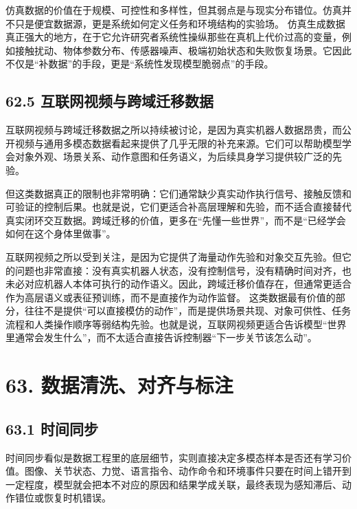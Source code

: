 仿真数据的价值在于规模、可控性和多样性，但其弱点是与现实分布错位。仿真并不只是便宜数据源，更是系统如何定义任务和环境结构的实验场。 仿真生成数据真正强大的地方，在于它允许研究者系统性操纵那些在真机上代价过高的变量，例如接触扰动、物体参数分布、传感器噪声、极端初始状态和失败恢复场景。它因此不仅是“补数据”的手段，更是“系统性发现模型脆弱点”的手段。

\section*{62.5 互联网视频与跨域迁移数据}


互联网视频与跨域迁移数据之所以持续被讨论，是因为真实机器人数据昂贵，而公开视频与通用多模态数据看起来提供了几乎无限的补充来源。它们可以帮助模型学会对象外观、场景关系、动作意图和任务语义，为后续具身学习提供较广泛的先验。

但这类数据真正的限制也非常明确：它们通常缺少真实动作执行信号、接触反馈和可验证的控制后果。也就是说，它们更适合补高层理解和先验，而不适合直接替代真实闭环交互数据。跨域迁移的价值，更多在“先懂一些世界”，而不是“已经学会如何在这个身体里做事”。

互联网视频之所以受到关注，是因为它提供了海量动作先验和对象交互先验。但它的问题也非常直接：没有真实机器人状态，没有控制信号，没有精确时间对齐，也未必对应机器人本体可执行的动作语义。因此，跨域迁移价值存在，但通常更适合作为高层语义或表征预训练，而不是直接作为动作监督。 这类数据最有价值的部分，往往不是提供“可以直接模仿的动作”，而是提供场景共现、对象可供性、任务流程和人类操作顺序等弱结构先验。也就是说，互联网视频更适合告诉模型“世界里通常会发生什么”，而不太适合直接告诉控制器“下一步关节该怎么动”。

\chapter*{63. 数据清洗、对齐与标注}

\section*{63.1 时间同步}


时间同步看似是数据工程里的底层细节，实则直接决定多模态样本是否还有学习价值。图像、关节状态、力觉、语言指令、动作命令和环境事件只要在时间上错开到一定程度，模型就会把本不对应的原因和结果学成关联，最终表现为感知滞后、动作错位或恢复时机错误。

